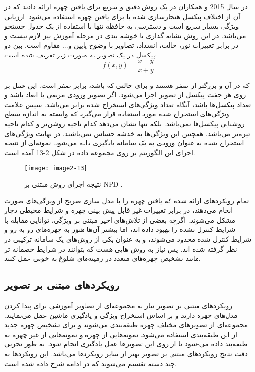 در سال 2015  و همکاران در \cite{7130626} یک روش دقیق و سریع برای یافتن چهره ارائه دادند که در آن از اختلاف پیکسل هنجارسازی شده یا  برای یافتن چهره استفاده می‌شود. ارزیابی ویژگی  بسیار سریع است و دسترسی به حافظه تنها با استفاده از یک جدول جستجو می‌باشد. در این روش نشانه گذاری یا خوشه بندی در مرحله آموزش نیز لازم نیست و در برابر تغییرات نور، حالت، انسداد، تصاویر با وضوح پایین و... مقاوم است.  بین دو پیکسل در یک تصویر به صورت زیر تعریف شده است:
\begin{equation}\label{eq2-6}
f(x,y) = \frac{x - y}{x + y}
\end{equation}

\noindent
که در آن  و  بزرگتر از صفر هستند و  برای حالتی که  باشد، برابر صفر است. این عمل بر روی هر جفت پیکسل از تصویر اجرا می‌شود. اگر تصویر ورودی مربعی با ابعاد  باشد و  تعداد پیکسل‌ها باشد، آنگاه تعداد ویژگی‌های استخراج شده برابر  می‌باشد. سپس علامت  ویژگی‌های استخراج شده مورد استفاده قرار می‌گیرد که وابسته به اندازه سطح روشنایی پیکسل‌ها نمی‌باشد. بلکه تنها نشان می‌دهد کدام ناحیه روشن‌تر و کدام ناحیه تیره‌تر می‌باشد. همچنین این ویژگی‌ها به خدشه  حساس نمی‌باشند. در نهایت ویژگی‌های استخراج شده به عنوان ورودی به یک سامانه یادگیری داده می‌شود. نمونه‌ای از نتیجه اجرای این الگوریتم بر روی مجموعه داده  در شکل 2-13 آمده است.
 
 \begin{figure}[h]
\centering
  \texttt{[image: image2-13]}
  \caption{نتیجه اجرای روش مبتنی بر NPD \cite{ref1}.}
  \label{image2-13}
\end{figure}

\noindent
تمام رویکرد‌های ارائه شده که یافتن چهره را با مدل سازی صریح از ویژگی‌های صورت انجام می‌دهند، در برابر تغییرات غیر قابل پیش بینی چهره و شرایط محیطی دچار مشکل می‌شوند. اگرچه بعضی از تلاش‌های اخیر مبتنی بر ویژگی، توانایی مقابله با شرایط کنترل نشده را بهبود داده اند، اما بیشتر آن‌ها هنوز به چهره‌های رو به رو و شرایط کنترل شده محدود می‌شوند، و به عنوان یکی از روش‌های یک سامانه ترکیبی در نظر گرفته شده اند. پس نیاز به روش-هایی هست که بتوانند در شرایط خصمانه تر مانند تشخیص چهره‌های متعدد در زمینه‌های شلوغ به خوبی عمل کنند.

 \subsection{رویکردهای مبتنی بر تصویر}
رویکردهای مبتنی بر تصویر نیاز به مجموعه‌ای از تصاویر آموزشی برای پیدا کردن مدل‌های چهره دارند و بر اساس استخراج ویژگی و یادگیری ماشین عمل می‌نمایند. مجموعه‌ای از تصویر‌های مختلف چهره طبقه‌بندی می‌شوند و برای تشخیص چهره جدید از این طبقه‌بندی استفاده می‌شود. نمونه‌هایی از چهره و نمونه‌هایی از غیر چهره به طبقه‌بند داده می-شود تا از روی این تصویرها عمل یادگیری انجام شود. به طور تجربی دقت نتایج رویکردهای مبتنی بر تصویر بهتر از سایر رویکرد‌ها می‌باشد. این رویکردها به چند دسته تقسیم می‌شوند که در ادامه شرح داده شده است. 


